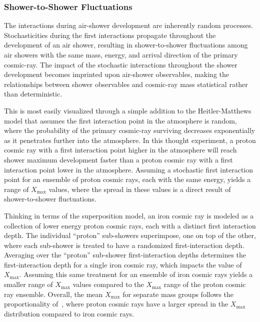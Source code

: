 \subsubsection{Shower-to-Shower Fluctuations}\label{sssec:fluctuations}
The interactions during air-shower development are inherently random processes.
Stochasticities during the first interactions propagate throughout the development of an air shower, resulting in shower-to-shower fluctuations among air showers with the same mass, energy, and arrival direction of the primary cosmic-ray.
The impact of the stochastic interactions throughout the shower development becomes imprinted upon air-shower observables, making the relationships between shower observables and cosmic-ray mass statistical rather than deterministic.

This is most easily visualized through a simple addition to the Heitler-Matthews model that assumes the first interaction point in the atmosphere is random, where the probability of the primary cosmic-ray surviving decreases exponentially as it penetrates further into the atmosphere.
In this thought experiment, a proton cosmic ray with a first interaction point higher in the atmosphere will reach shower maximum development faster than a proton cosmic ray with a first interaction point lower in the atmosphere.
Assuming a stochastic first interaction point for an ensemble of proton cosmic rays, each with the same energy, yields a range of $X_{\text{max}}$ values, where the spread in these values is a direct result of shower-to-shower fluctuations. 

Thinking in terms of the superposition model, an iron cosmic ray is modeled as a collection of lower energy proton cosmic rays, each with a distinct first interaction depth.
The individual ``proton'' sub-showers superimpose, one on top of the other, where each sub-shower is treated to have a randomized first-interaction depth.
Averaging over the ``proton'' sub-shower first-interaction depths determines the first-interaction depth for a single iron cosmic ray, which impacts the value of $X_{\text{max}}$.
Assuming this same treatment for an ensemble of iron cosmic rays yields a smaller range of $X_{\text{max}}$ values compared to the $X_{\text{max}}$ range of the proton cosmic ray ensemble.
Overall, the mean $X_{\text{max}}$ for separate mass groups follows the proportionality of~, where proton cosmic rays have a larger spread in the $X_{\text{max}}$ distribution compared to iron cosmic rays.

